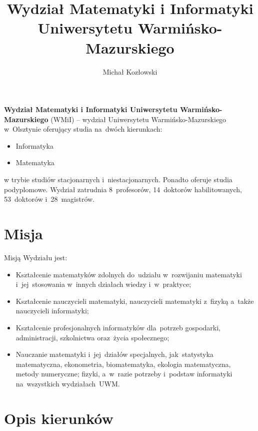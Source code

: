 ﻿\documentclass[a4paper,12pt]{article}
\begin{document}
\title{Wydział Matematyki i Informatyki Uniwersytetu
Warmińsko-Mazurskiego}
\author{Michał Kozłowski}

\maketitle

\textbf{Wydział Matematyki i Informatyki Uniwersytetu Warmińsko-Mazurskiego} (WMiI) – wydział
Uniwersytetu Warmińsko-Mazurskiego w~Olsztynie oferujący studia na~dwóch kierunkach:
\begin{itemize}
\item Informatyka
\item Matematyka
\end{itemize}
w trybie studiów stacjonarnych i~niestacjonarnych. Ponadto oferuje studia podyplomowe.
Wydział zatrudnia 8~profesorów, 14~doktorów habilitowanych, 53~doktorów i~28~magistrów.


\tableofcontents


\section{Misja}

Misją Wydziału jest:
\begin{itemize}
	\item Kształcenie matematyków zdolnych do~udziału w~rozwijaniu matematyki i~jej~stosowania w~innych działach wiedzy i~w~praktyce;
	\item Kształcenie nauczycieli matematyki, nauczycieli matematyki z~fizyką a~także nauczycieli informatyki;
	\item Kształcenie profesjonalnych informatyków dla~potrzeb gospodarki, administracji, szkolnictwa oraz~życia społecznego;
	\item Nauczanie matematyki i~jej~działów specjalnych, jak~statystyka matematyczna, ekonometria, biomatematyka, ekologia matematyczna, metody numeryczne; fizyki, a~w~razie potrzeby i~podstaw informatyki na~wszystkich wydziałach~UWM.
\end{itemize}


\section{Opis kierunków}
\end{document}
